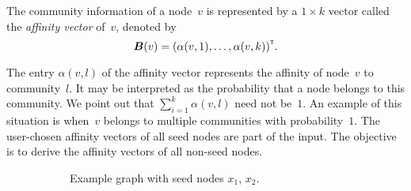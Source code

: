 The community information of a node~$v$ is represented 
by a $1 \times k$ vector called the \emph{affinity vector} of~$v$, denoted 
by 
\[
	\boldsymbol{B} (v) = {\left ( \alpha (v, 1), \ldots, \alpha (v, k) \right )}^{\scriptscriptstyle \mathsf{T}}.
\] 

The entry $\alpha (v, l)$ of the affinity vector represents the affinity of node~$v$ to community~$l$.
It may be interpreted as the probability that a node belongs to this community.
We point out that $\sum_{i = 1}^k \alpha (v, l)$ need not be~$1$.
An example of this situation is when~$v$ belongs to multiple 
communities with probability~$1$. 
The user-chosen affinity vectors of all seed nodes are part of the input.
The objective is to derive the affinity vectors of all non-seed nodes. 



\begin{figure}
\centering
\begin{subfigure}{\textwidth}
    \centering
    \caption{Example graph with seed nodes $x_1$, $x_2$.}
\end{subfigure}
\\[0.5cm]
\begin{subfigure}{\textwidth}
    \centering
\end{subfigure}
\end{figure}
